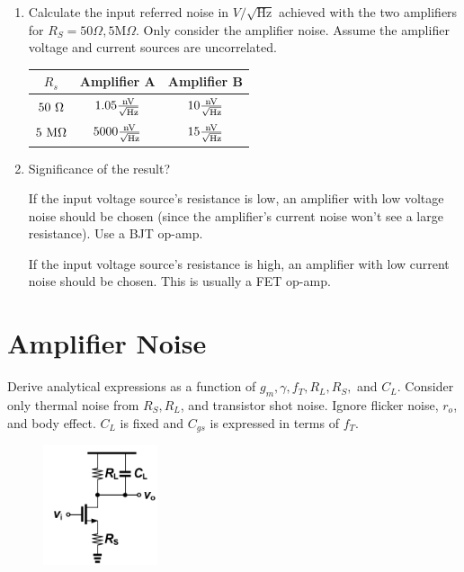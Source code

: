 \begin{enumerate}[label=(\alph*)]
  \item {\color{blue}Calculate the input referred noise in $V / \sqrt{\text{Hz}}$ achieved with the two amplifiers for $R_S = 50 \Omega, 5 \text{M}\Omega$. Only consider the amplifier noise. Assume the amplifier voltage and current sources are uncorrelated.}

  \begin{center}
    \begin{tabular}{ |c|c|c| }
      \hline
      $R_s$ & Amplifier A & Amplifier B \\ \hline
      $50 \text{ }\Omega$ & $1.05 \frac{\text{nV}}{\sqrt{\text{Hz}}}$ & $10 \frac{\text{nV}}{\sqrt{\text{Hz}}}$ \\ \hline
      $5 \text{ M}\Omega$ & $5000 \frac{\text{nV}}{\sqrt{\text{Hz}}}$ & $15 \frac{\text{nV}}{\sqrt{\text{Hz}}}$ \\ \hline
    \end{tabular}
  \end{center}

  \item {\color{blue}Significance of the result?}

  If the input voltage source's resistance is low, an amplifier with low voltage noise should be chosen (since the amplifier's current noise won't see a large resistance). Use a BJT op-amp.

  If the input voltage source's resistance is high, an amplifier with low current noise should be chosen. This is usually a FET op-amp.
\end{enumerate}

\section{Amplifier Noise}
Derive analytical expressions as a function of $g_m, \gamma, f_T, R_L, R_S,$ and $C_L$. Consider only thermal noise from $R_S, R_L$, and transistor shot noise. Ignore flicker noise, $r_o$, and body effect. $C_L$ is fixed and $C_{gs}$ is expressed in terms of $f_T$.
\begin{figure}[H]
  \centering
  \includegraphics[width=0.3\textwidth]{figs/problem2.png}
\end{figure}

